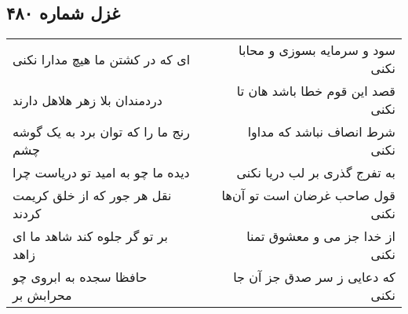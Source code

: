 \begin{center}
\section*{غزل شماره ۴۸۰}
\label{sec:sh480}
\begin{longtable}{l p{0.5cm} r}
ای که در کشتن ما هیچ مدارا نکنی
&&
سود و سرمایه بسوزی و محابا نکنی
\\
دردمندان بلا زهر هلاهل دارند
&&
قصد این قوم خطا باشد هان تا نکنی
\\
رنج ما را که توان برد به یک گوشه چشم
&&
شرط انصاف نباشد که مداوا نکنی
\\
دیده ما چو به امید تو دریاست چرا
&&
به تفرج گذری بر لب دریا نکنی
\\
نقل هر جور که از خلق کریمت کردند
&&
قول صاحب غرضان است تو آن‌ها نکنی
\\
بر تو گر جلوه کند شاهد ما ای زاهد
&&
از خدا جز می و معشوق تمنا نکنی
\\
حافظا سجده به ابروی چو محرابش بر
&&
که دعایی ز سر صدق جز آن جا نکنی
\\
\end{longtable}
\end{center}
